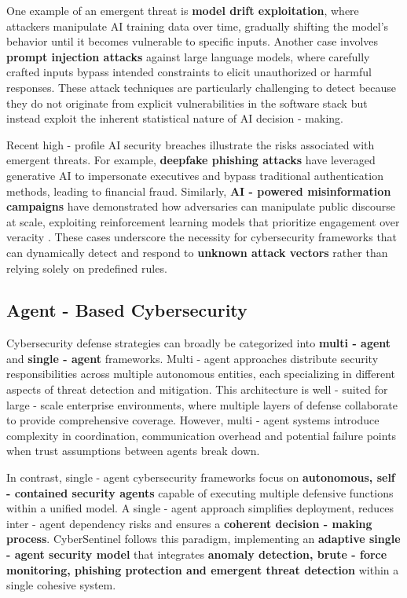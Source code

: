 \documentclass{article}
\begin{document}
One example of an emergent threat is \textbf{model drift exploitation}, where attackers manipulate AI training data over time, gradually shifting the model’s behavior until it becomes vulnerable to specific inputs. Another case involves \textbf{prompt injection attacks} against large language models, where carefully crafted inputs bypass intended constraints to elicit unauthorized or harmful responses. These attack techniques are particularly challenging to detect because they do not originate from explicit vulnerabilities in the software stack but instead exploit the inherent statistical nature of AI decision - making.

Recent high - profile AI security breaches illustrate the risks associated with emergent threats. For example, \textbf{deepfake phishing attacks} have leveraged generative AI to impersonate executives and bypass traditional authentication methods, leading to financial fraud. Similarly, \textbf{AI - powered misinformation campaigns} have demonstrated how adversaries can manipulate public discourse at scale, exploiting reinforcement learning models that prioritize engagement over veracity \cite{sharif2016accessorize}. These cases underscore the necessity for cybersecurity frameworks that can dynamically detect and respond to \textbf{unknown attack vectors} rather than relying solely on predefined rules.

\subsection{Agent - Based Cybersecurity}
Cybersecurity defense strategies can broadly be categorized into \textbf{multi - agent} and \textbf{single - agent} frameworks. Multi - agent approaches distribute security responsibilities across multiple autonomous entities, each specializing in different aspects of threat detection and mitigation. This architecture is well - suited for large - scale enterprise environments, where multiple layers of defense collaborate to provide comprehensive coverage. However, multi - agent systems introduce complexity in coordination, communication overhead and potential failure points when trust assumptions between agents break down.

In contrast, single - agent cybersecurity frameworks focus on \textbf{autonomous, self - contained security agents} capable of executing multiple defensive functions within a unified model. A single - agent approach simplifies deployment, reduces inter - agent dependency risks and ensures a \textbf{coherent decision - making process}. CyberSentinel follows this paradigm, implementing an \textbf{adaptive single - agent security model} that integrates \textbf{anomaly detection, brute - force monitoring, phishing protection and emergent threat detection} within a single cohesive system.
\end{document}
